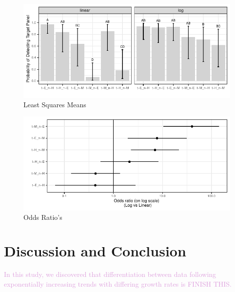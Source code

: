 \documentclass[]{interact}
\theoremstyle{plain}%
\theoremstyle{definition}
\theoremstyle{remark}
\begin{document}
\begin{figure}
\centering
\includegraphics{jsm-2021-student-paper-submission_files/figure-latex/lsmeans-plot-1.pdf}
\caption{Least Squares Means}
\end{figure}

\begin{figure}
\centering
\includegraphics{jsm-2021-student-paper-submission_files/figure-latex/odds-ratio-plot-1.pdf}
\caption{Odds Ratio's}
\end{figure}

\hypertarget{discussion-and-conclusion}{%
\section{Discussion and Conclusion}\label{discussion-and-conclusion}}

\textcolor{Plum}{
In this study, we discovered that differentiation between data following exponentially increasing trends with differing growth rates is FINISH THIS.
}
\end{document}
